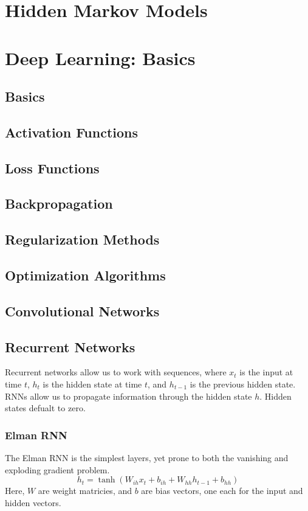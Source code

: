 \documentclass[twoside,twocolumn]{article}
\begin{document}
\section{Hidden Markov Models}
\section{Deep Learning: Basics}
\subsection{Basics}
\subsection{Activation Functions}
\subsection{Loss Functions}
\subsection{Backpropagation}
\subsection{Regularization Methods}
\subsection{Optimization Algorithms}
\subsection{Convolutional Networks}
\subsection{Recurrent Networks}
Recurrent networks allow us to work with sequences, where $x_t$ is the input
at time $t$, $h_t$ is the hidden state at time $t$, and $h_{t-1}$ is the
previous hidden state. RNNs allow us to propagate information through the
hidden state $h$. Hidden states defualt to zero.
\subsubsection{Elman RNN}
The Elman RNN is the simplest layers, yet prone to both the vanishing and
exploding gradient problem.
\begin{equation}
  h_t = \tanh \left( W_{ih} x_t + b_{ih} + W_{hh} h_{t-1} + b_{hh} \right)
\end{equation}
Here, $W$ are weight matricies, and $b$ are bias vectors, one each for the
input and hidden vectors.
\end{document}

